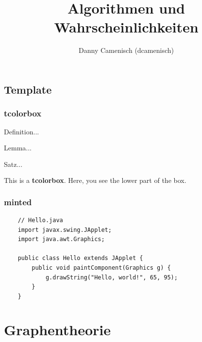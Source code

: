 \documentclass[a4paper]{report}
\title{Algorithmen und Wahrscheinlichkeiten}
\author{Danny Camenisch (dcamenisch)}
\begin{document}
\maketitle
\tableofcontents
\listofalgorithms



\chapter{Template}
\section{tcolorbox}

\begin{definition}
    Definition...
\end{definition}

\begin{lemma}
    Lemma...
\end{lemma}

\begin{satz}
    Satz...
\end{satz}

\begin{tcolorbox}[colback=dcWhite,colframe=dcOrange,title=\textbf{My Heading}]
    This is a \textbf{tcolorbox}.
\tcblower
    Here, you see the lower part of the box.
\end{tcolorbox}

\section{minted}

\begin{verbatim}
    // Hello.java
    import javax.swing.JApplet;
    import java.awt.Graphics;
    
    public class Hello extends JApplet {
        public void paintComponent(Graphics g) {
            g.drawString("Hello, world!", 65, 95);
        }    
    }
\end{verbatim}



\part{Graphentheorie}
\end{document}
